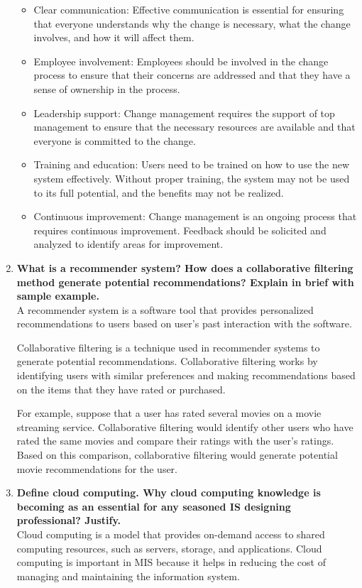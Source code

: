 \documentclass[12pt]{article}
\begin{document}
\begin{enumerate}
\begin{itemize}
\item Clear communication: Effective communication is essential for ensuring that everyone understands why the change is necessary, what the change involves, and how it will affect them.
\item Employee involvement: Employees should be involved in the change process to ensure that their concerns are addressed and that they have a sense of ownership in the process.
\item Leadership support: Change management requires the support of top management to ensure that the necessary resources are available and that everyone is committed to the change.
\item Training and education: Users need to be trained on how to use the new system effectively. Without proper training, the system may not be used to its full potential, and the benefits may not be realized.
\item Continuous improvement: Change management is an ongoing process that requires continuous improvement. Feedback should be solicited and analyzed to identify areas for improvement.
\end{itemize}
    \item {\bfseries What is a recommender system? How does a collaborative filtering method generate potential recommendations? Explain in brief with sample example.\\}
    A recommender system is a software tool that provides personalized recommendations to users based on user's past interaction with the software. 
    
    Collaborative filtering is a technique used in recommender systems to generate potential recommendations. Collaborative filtering works by identifying users with similar preferences and making recommendations based on the items that they have rated or purchased.
    
    For example, suppose that a user has rated several movies on a movie streaming service. Collaborative filtering would identify other users who have rated the same movies and compare their ratings with the user's ratings. Based on this comparison, collaborative filtering would generate potential movie recommendations for the user.
    \item {\bfseries Define cloud computing. Why cloud computing knowledge is becoming as an essential for any seasoned IS designing professional? Justify.\\}
    Cloud computing is a model that provides on-demand access to shared computing resources, such as servers, storage, and applications. Cloud computing is important in MIS because it helps in reducing the cost of managing and maintaining the information system.
    

\end{enumerate}
\end{document}

